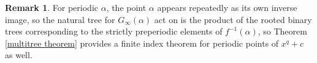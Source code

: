 \documentclass[11pt]{amsart}
\theoremstyle{definition}
\theoremstyle{definition}
\newtheorem{rem}[thm]{Remark}
\numberwithin{thm}{section}
\numberwithin{equation}{thm}
\begin{document}
\begin{rem}\label{per}
  For periodic $\alpha$, the point $\alpha$ appears repeatedly as its
  own inverse image, so the natural tree for $G_\infty(\alpha)$ act on
  is the product of the rooted binary trees corresponding to the
  strictly preperiodic elements of $f^{-1}(\alpha)$, so Theorem
  \ref{multitree theorem} provides a finite index theorem for periodic
  points of $x^q + c$ as well.   
\end{rem}






\newcommand{\etalchar}[1]{$^{#1}$}
\providecommand{\bysame}{\leavevmode\hbox to3em{\hrulefill}\thinspace}
\providecommand{\MR}{\relax\ifhmode\unskip\space\fi MR }
\providecommand{\MRhref}[2]{%
  \href{http://www.ams.org/mathscinet-getitem?mr=#1}{#2}
}
\providecommand{\href}[2]{#2}
\end{document}
